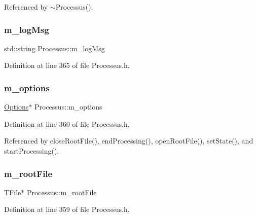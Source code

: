 Referenced by $\sim$\+Processus().

\mbox{\label{classProcessus_a3bc0140a3a69a83951ab7f9986bd2c84}} 
\subsubsection{\texorpdfstring{m\+\_\+log\+Msg}{m\_logMsg}}
{\footnotesize\ttfamily std\+::string Processus\+::m\+\_\+log\+Msg\hspace{0.3cm}{\ttfamily [private]}}



Definition at line 365 of file Processus.\+h.

\mbox{\label{classProcessus_a74205f3c1e00c4448f7b3257c2351797}} 
\subsubsection{\texorpdfstring{m\+\_\+options}{m\_options}}
{\footnotesize\ttfamily \hyperlink{classOptions}{Options}$\ast$ Processus\+::m\+\_\+options\hspace{0.3cm}{\ttfamily [private]}}



Definition at line 360 of file Processus.\+h.



Referenced by close\+Root\+File(), end\+Processing(), open\+Root\+File(), set\+State(), and start\+Processing().

\mbox{\label{classProcessus_a76114f8cf2111e910c323a7ae05a015d}} 
\subsubsection{\texorpdfstring{m\+\_\+root\+File}{m\_rootFile}}
{\footnotesize\ttfamily T\+File$\ast$ Processus\+::m\+\_\+root\+File\hspace{0.3cm}{\ttfamily [private]}}



Definition at line 359 of file Processus.\+h.



